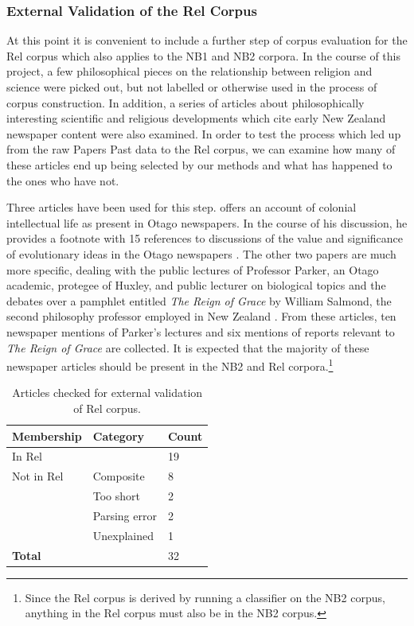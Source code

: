 \documentclass{article}
\begin{document}


\subsubsection{External Validation of the Rel Corpus}\label{s:external-validation}

At this point it is convenient to include a further step of corpus evaluation for the Rel corpus which also applies to the NB1 and NB2 corpora. In the course of this project, a few philosophical pieces on the relationship between religion and science were picked out, but not labelled or otherwise used in the process of corpus construction. In addition, a series of articles about philosophically interesting scientific and religious developments which cite early New Zealand newspaper content were also examined. In order to test the process which led up from the raw Papers Past data to the Rel corpus, we can examine how many of these articles end up being selected by our methods and what has happened to the ones who have not.

Three articles have been used for this step. \cite{ballantyne-2012} offers an account of colonial intellectual life as present in Otago newspapers. In the course of his discussion, he provides a footnote with 15 references to discussions of the value and significance of evolutionary ideas in the Otago newspapers \cite[fn. 53]{ballantyne-2012}. The other two papers are much more specific, dealing with the public lectures of Professor Parker, an Otago academic, protegee of Huxley, and public lecturer on biological topics \cite{crane-2013} and the debates over a pamphlet entitled \emph{The Reign of Grace} by William Salmond, the second philosophy professor employed in New Zealand \cite{wood-2014}. From these articles, ten newspaper mentions of Parker's lectures and six mentions of reports relevant to \textit{The Reign of Grace} are collected. It is expected that the majority of these newspaper articles should be present in the NB2 and Rel corpora.\footnote{Since the Rel corpus is derived by running a classifier on the NB2 corpus, anything in the Rel corpus must also be in the NB2 corpus.}

\begin{table}
  \centering
  \begin{tabular}{l|ll}
    \textbf{Membership} & \textbf{Category} & \textbf{Count} \\
    \hline
    In Rel & & 19 \\
    \hline
    Not in Rel & Composite & 8 \\
     & Too short & 2 \\
     & Parsing error & 2 \\
    & Unexplained & 1 \\
    \hline
    \textbf{Total} & & 32 \\
  \end{tabular}
  \label{t:ext-val}
  \caption{Articles checked for external validation of Rel corpus.}
\end{table}
\end{document}
